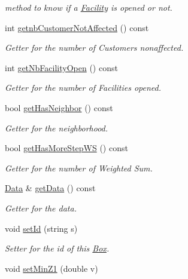 \begin{DoxyCompactItemize}
\begin{DoxyCompactList}\small\item\em method to know if a {\ttfamily \hyperlink{classFacility}{\-Facility}} is opened or not. \end{DoxyCompactList}\item 
int \hyperlink{classBox_a06d670aa91a2ce2379952226aa2f1ace}{getnb\-Customer\-Not\-Affected} () const 
\begin{DoxyCompactList}\small\item\em \-Getter for the number of {\ttfamily \-Customers} nonaffected. \end{DoxyCompactList}\item 
int \hyperlink{classBox_ad440d49ac6af6f507d3fe2b04706a03f}{get\-Nb\-Facility\-Open} () const 
\begin{DoxyCompactList}\small\item\em \-Getter for the number of {\ttfamily \-Facilities} opened. \end{DoxyCompactList}\item 
bool \hyperlink{classBox_a54fc33d2322333a3b29e3d0678c91211}{get\-Has\-Neighbor} () const 
\begin{DoxyCompactList}\small\item\em \-Getter for the neighborhood. \end{DoxyCompactList}\item 
bool \hyperlink{classBox_a42f209ba50a33b65ff39cb70b98441ac}{get\-Has\-More\-Step\-W\-S} () const 
\begin{DoxyCompactList}\small\item\em \-Getter for the number of \-Weighted \-Sum. \end{DoxyCompactList}\item 
\hyperlink{classData}{\-Data} \& \hyperlink{classBox_a3282ed9a0751fc5c0cdb71c73b63c368}{get\-Data} () const 
\begin{DoxyCompactList}\small\item\em \-Getter for the data. \end{DoxyCompactList}\item 
void \hyperlink{classBox_a73fb06291c001bea5f90358e7d53c2ec}{set\-Id} (string s)
\begin{DoxyCompactList}\small\item\em \-Setter for the id of this {\ttfamily \hyperlink{classBox}{\-Box}}. \end{DoxyCompactList}\item 
void \hyperlink{classBox_a0a5aeb1b1a64068ab016abf9146bae7e}{set\-Min\-Z1} (double v)

\end{DoxyCompactItemize}
